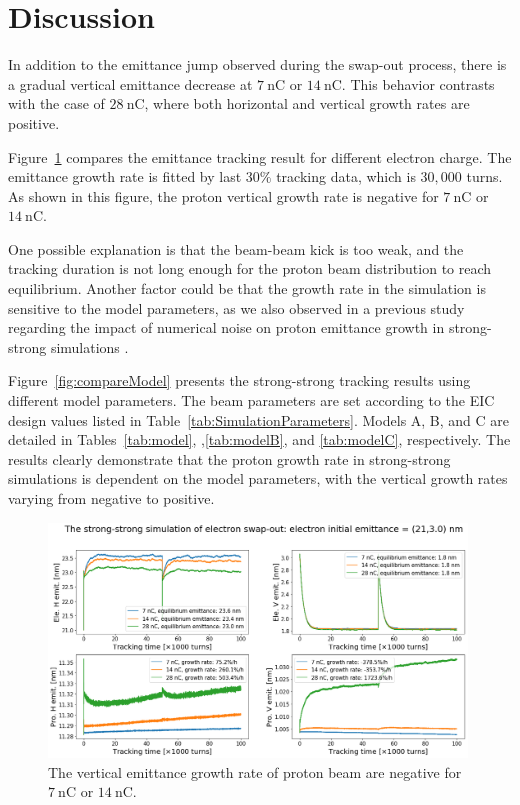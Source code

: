 \documentclass{article}
\begin{document}
\section{Discussion}
In addition to the emittance jump observed during the swap-out 
process, there is a gradual vertical emittance decrease at 
$7 ~\mathrm{nC}$ or $14~\mathrm{nC}$. This behavior 
contrasts with the case of $28~\mathrm{nC}$, where both 
horizontal and vertical growth rates are positive.

Figure~\ref{fig:compareCharge} compares the emittance tracking
result for different electron charge. The emittance growth 
rate is fitted by last $30\%$ tracking data, which is $30,000$
turns. As shown in this figure, the proton vertical growth
rate is negative for $7~\mathrm{nC}$ or $14~\mathrm{nC}$.

One possible explanation is that the beam-beam kick is too 
weak, and the tracking duration is not long enough for the 
proton beam distribution to reach equilibrium. Another factor 
could be that the growth rate in the simulation is sensitive 
to the model parameters, as we also observed in a previous 
study regarding the impact of numerical noise on proton 
emittance growth in strong-strong simulations \cite{xu:beamDynamicsWorkshop}. 

Figure~\ref{fig:compareModel} presents the strong-strong 
tracking results using different model parameters. 
The beam parameters are set according to the EIC design 
values listed in Table~\ref{tab:SimulationParameters}.
Models A, B, and C are detailed in Tables~\ref{tab:model},
,\ref{tab:modelB}, and \ref{tab:modelC}, respectively.
The results clearly demonstrate that the proton growth rate 
in strong-strong simulations is dependent on the model 
parameters, with the vertical growth rates varying from 
negative to positive.

\begin{figure}
    \centering
    \includegraphics[width=0.99\textwidth]{pic/compareCharge.png}
    \caption{The vertical emittance growth rate of proton beam are negative for $7~\mathrm{nC}$ or $14~\mathrm{nC}$.}
    \label{fig:compareCharge}
\end{figure}
\end{document}
